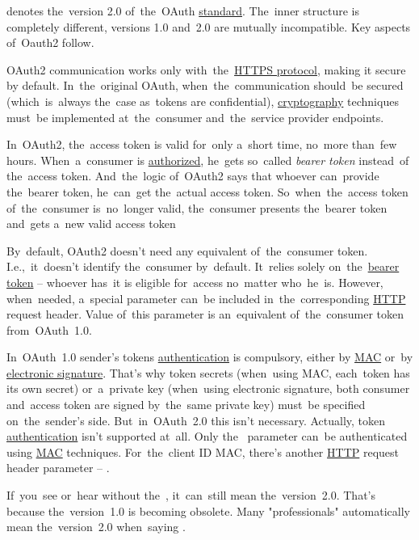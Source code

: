  denotes the~version 2.0 of~the~OAuth \hyperref[protocolstandard]{standard}.
The~inner structure is completely different, versions 1.0 \mbox{and 2.0} are mutually incompatible.
Key aspects of~Oauth2 follow.

OAuth2 communication works only with~the~\hyperref[https]{HTTPS protocol}, making it secure by default.
In~the~original OAuth, when~the~communication should~be secured (which~is~always the~case as~tokens are confidential), \hyperref[cryptography]{cryptography} techniques must~be implemented at~the~consumer and~the~service provider endpoints.

\label{oauth2accesstokenvalidity}
In~OAuth2, the~access token is valid for~only a~short time, no~more than~few hours.
When~a~consumer is \hyperref[authenticationauthorization]{authorized}, he~gets so~called \textit{bearer token} instead~of the~access token.
And~the~logic of~OAuth2 says that whoever can~provide the~bearer token, he~can~get the~actual access token.
So~when~the~access token of~the~consumer is~no~longer valid, the~consumer presents the~bearer token and~gets a~new valid access token

\label{oauth2consumerauthentication}
By~default, OAuth2 doesn't need any equivalent of~the~consumer token.
I.e.,~it~doesn't identify the~consumer by~default.
It~relies solely on~the~\hyperref[oauth2accesstokenvalidity]{bearer token} -- whoever has~it is eligible for~access no~matter who~he~is.
However, when~needed, a~special parameter  can~be included in~the~corresponding \hyperref[http]{HTTP} request header.
Value of~this parameter is an~equivalent of~the~consumer token \mbox{from OAuth 1.0.}

\mbox{In OAuth 1.0} sender's tokens \hyperref[authenticationauthorization]{authentication} is compulsory, either by \hyperref[mac]{MAC} or~by \hyperref[electronicsignature]{electronic signature}.
That's why token secrets (when~using MAC, each~token has its own secret) or~a~private key (when~using electronic signature, both consumer and~access token are signed by~the~same private key) must~be specified on~the~sender's side.
\mbox{But in OAuth 2.0} this isn't necessary.
Actually, token \hyperref[authenticationauthorization]{authentication} isn't supported at~all.
Only the~\hyperref[oauth2consumerauthentication]{} parameter can~be authenticated using \hyperref[mac]{MAC} techniques.
For~the~client ID MAC, there's another \hyperref[http]{HTTP} request header parameter -- \mbox{.}

\warning If~you~see or~hear  without the~, it~can~still mean the~version~\mbox{2.0.}
That's because the~version~\mbox{1.0} is becoming obsolete.
Many "professionals" automatically mean the~version~\mbox{2.0} when~saying .
